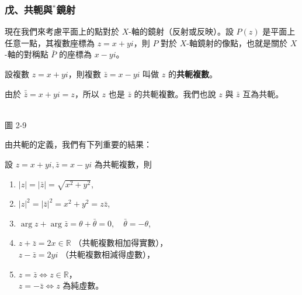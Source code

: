 \subsubsection*{戊、共軛與$^*$鏡射}

現在我們來考慮平面上的點對於 $X$-軸的鏡射（反射或反映）。設 $P(z)$ 是平面上任意一點，其複數座標為 $z=x+yi$，則 $P$ 對於 $X$-軸鏡射的像點，也就是關於 $X$-軸的對稱點 $\bar{P}$ 的座標為 $x-yi$。

\begin{center}
\begin{minipage}{0.55\textwidth}
\begin{definition}
設複數 $z=x+yi$，則複數 $\bar{z}=x-yi$ 叫做 $z$ 的\textbf{共軛複數}。
\end{definition}
由於 $\bar{\bar{z}} = x+yi = z$，所以 $z$ 也是 $\bar{z}$ 的共軛複數。我們也說 $z$ 與 $\bar{z}$ 互為共軛。
\end{minipage}
\hfill
\begin{minipage}{0.42\textwidth}
\centering
{}
\\[5pt]
\small 圖 2-9
\end{minipage}
\end{center}

由共軛的定義，我們有下列重要的結果：

設 $z=x+yi, \bar{z}=x-yi$ 為共軛複數，則
\begin{enumerate}
  \item $|z| = |\bar{z}| = \sqrt{x^2+y^2}$,
  \item $|z|^2 = |\bar{z}|^2 = x^2+y^2 = z\bar{z}$,
  \item $\arg z + \arg\bar{z} = \theta+\bar{\theta} = 0, \quad \bar{\theta} = -\theta$,
  \item $z+\bar{z} = 2x \in \mathbb{R}$ （共軛複數相加得實數），\\
  $z-\bar{z} = 2yi$ （共軛複數相減得虛數），
  \item $z = \bar{z} \iff z \in \mathbb{R}$，\\
  $z = -\bar{z} \iff z$ 為純虛數。
\end{enumerate}

